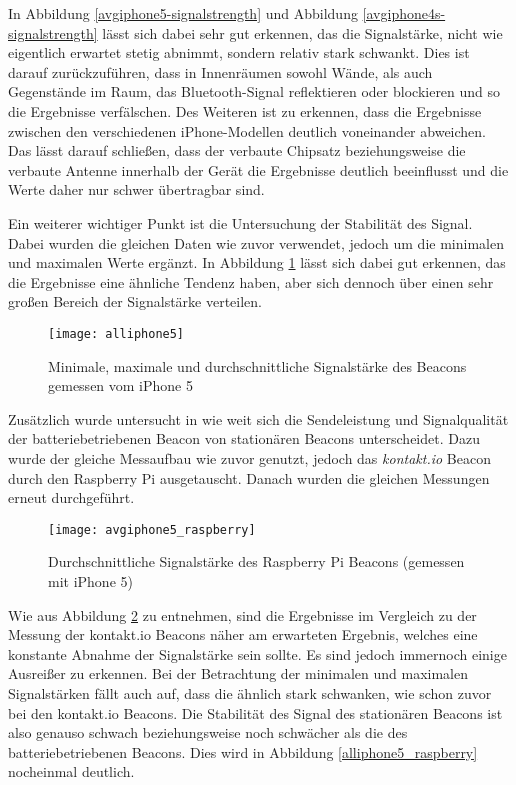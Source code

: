 In Abbildung \ref{avgiphone5-signalstrength} und Abbildung \ref{avgiphone4s-signalstrength} lässt sich dabei sehr gut erkennen, das die Signalstärke, nicht wie eigentlich erwartet stetig abnimmt, sondern relativ stark schwankt. Dies ist darauf zurückzuführen, dass in Innenräumen sowohl Wände, als auch Gegenstände im Raum, das Bluetooth-Signal reflektieren oder blockieren und so die Ergebnisse verfälschen.
Des Weiteren ist zu erkennen, dass die Ergebnisse zwischen den verschiedenen iPhone-Modellen deutlich voneinander abweichen. Das lässt darauf schließen, dass der verbaute Chipsatz beziehungsweise die verbaute Antenne innerhalb der Gerät die Ergebnisse deutlich beeinflusst und die Werte daher nur schwer übertragbar sind.

Ein weiterer wichtiger Punkt ist die Untersuchung der Stabilität des Signal. Dabei wurden die gleichen Daten wie zuvor verwendet, jedoch um die minimalen und maximalen Werte ergänzt. In Abbildung \ref{all-iphone5} lässt sich dabei gut erkennen, das die Ergebnisse eine ähnliche Tendenz haben, aber sich dennoch über einen sehr großen Bereich der Signalstärke verteilen.

\begin{figure}[htb!]
		\centering
	\texttt{[image: alliphone5]}
	\caption{Minimale, maximale und durchschnittliche Signalstärke des Beacons gemessen vom iPhone 5}
	\label{all-iphone5}
\end{figure}


Zusätzlich wurde untersucht in wie weit sich die Sendeleistung und Signalqualität der batteriebetriebenen Beacon von stationären Beacons unterscheidet.
Dazu wurde der gleiche Messaufbau wie zuvor genutzt, jedoch das \emph{kontakt.io} Beacon durch den Raspberry Pi ausgetauscht. Danach wurden die gleichen Messungen erneut durchgeführt.

\begin{figure}[htb!]
		\centering
	\texttt{[image: avgiphone5\_raspberry]}
	\caption{Durchschnittliche Signalstärke des Raspberry Pi Beacons (gemessen mit iPhone 5)}
		\label{avgiphone5_raspberry}
\end{figure}

Wie aus Abbildung \ref{avgiphone5_raspberry} zu entnehmen, sind die Ergebnisse im Vergleich zu der Messung der kontakt.io Beacons näher am erwarteten Ergebnis, welches eine konstante Abnahme der Signalstärke sein sollte. Es sind jedoch immernoch einige Ausreißer zu erkennen. Bei der Betrachtung der minimalen und maximalen Signalstärken fällt auch auf, dass die ähnlich stark schwanken, wie schon zuvor bei den kontakt.io Beacons. Die Stabilität des Signal des stationären Beacons ist also genauso schwach beziehungsweise noch schwächer als die des batteriebetriebenen Beacons. Dies wird in Abbildung \ref{alliphone5_raspberry} nocheinmal deutlich.

